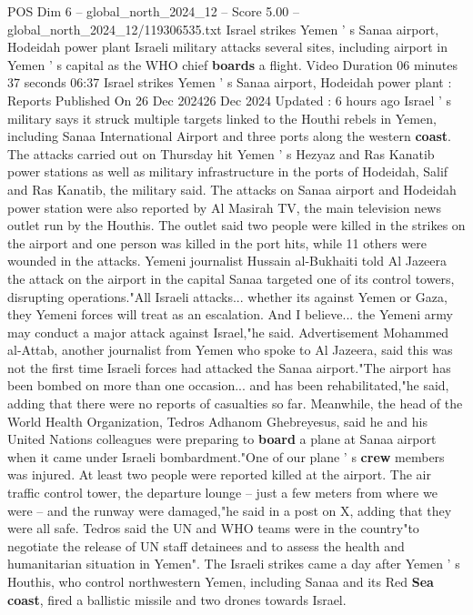 \begin{textsample}{POS Dim 6 – global\_north\_2024\_12 – Score 5.00 – global\_north\_2024\_12/119306535.txt}  \label{ex:f6_pos_266}
Israel strikes Yemen ' s Sanaa airport, Hodeidah power plant Israeli military attacks several sites, including airport in Yemen ' s capital as the WHO chief \textbf{boards} a flight.
Video Duration 06 minutes 37 seconds 06:37 Israel strikes Yemen ' s Sanaa airport, Hodeidah power plant : Reports Published On 26 Dec 202426 Dec 2024 Updated : 6 hours ago Israel ' s military says it struck multiple targets linked to the Houthi rebels in Yemen, including Sanaa International Airport and three ports along the western \textbf{coast}.
The attacks carried out on Thursday hit Yemen ' s Hezyaz and Ras Kanatib power stations as well as military infrastructure in the ports of Hodeidah, Salif and Ras Kanatib, the military said.
The attacks on Sanaa airport and Hodeidah power station were also reported by Al Masirah TV, the main television news outlet run by the Houthis.
The outlet said two people were killed in the strikes on the airport and one person was killed in the port hits, while 11 others were wounded in the attacks.
Yemeni journalist Hussain al-Bukhaiti told Al Jazeera the attack on the airport in the capital Sanaa targeted one of its control towers, disrupting operations."All Israeli attacks... whether its against Yemen or Gaza, they Yemeni forces will treat as an escalation.
And I believe... the Yemeni army may conduct a major attack against Israel,"he said.
Advertisement Mohammed al-Attab, another journalist from Yemen who spoke to Al Jazeera, said this was not the first time Israeli forces had attacked the Sanaa airport."The airport has been bombed on more than one occasion... and has been rehabilitated,"he said, adding that there were no reports of casualties so far.
Meanwhile, the head of the World Health Organization, Tedros Adhanom Ghebreyesus, said he and his United Nations colleagues were preparing to \textbf{board} a plane at Sanaa airport when it came under Israeli bombardment."One of our plane ' s \textbf{crew} members was injured.
At least two people were reported killed at the airport.
The air traffic control tower, the departure lounge -- just a few meters from where we were -- and the runway were damaged,"he said in a post on X, adding that they were all safe.
Tedros said the UN and WHO teams were in the country"to negotiate the release of UN staff detainees and to assess the health and humanitarian situation in Yemen".
The Israeli strikes came a day after Yemen ' s Houthis, who control northwestern Yemen, including Sanaa and its Red \textbf{Sea} \textbf{coast}, fired a ballistic missile and two drones towards Israel.

\end{textsample}
